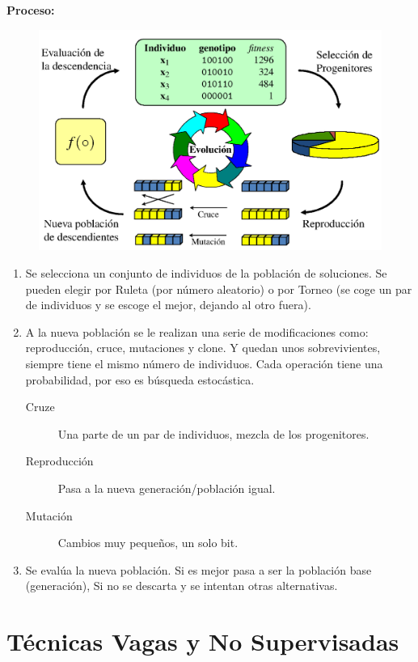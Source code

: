 \documentclass[12pt]{report} %
\begin{document}
\textbf{Proceso:}
\begin{figure}[H]
	{\includegraphics[scale=.3]{2021-03-19 11_42_34-otras-tecnicas.pdf - Foxit Reader.png}}
\end{figure}
\begin{enumerate}
  \item Se selecciona un conjunto de individuos de la población de soluciones. Se pueden elegir por Ruleta (por número aleatorio) o por Torneo (se coge un par de individuos y se escoge el mejor, dejando al otro fuera).
  \item A la nueva población se le realizan una serie de modificaciones como: reproducción, cruce, mutaciones y clone. Y quedan unos sobrevivientes, siempre tiene el mismo número de individuos.
  Cada operación tiene una probabilidad, por eso es búsqueda estocástica.
  \begin{description}
    \item[Cruze] Una parte de un par de individuos, mezcla de los progenitores.
    \item[Reproducción] Pasa a la nueva generación/población igual.
    \item[Mutación] Cambios muy pequeños, un solo bit.
  \end{description}
  \item Se evalúa la nueva población. Si es mejor pasa a ser la población base (generación), Si no se descarta y se intentan otras alternativas.
\end{enumerate}

\chapter{Técnicas Vagas y No Supervisadas}
\end{document}
